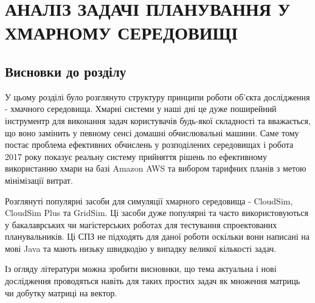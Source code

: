 
\chapter{АНАЛІЗ ЗАДАЧІ ПЛАНУВАННЯ У ХМАРНОМУ СЕРЕДОВИЩІ}







\section*{Висновки до розділу}

У цьому розділі було розглянуто структуру принципи роботи об'єкта дослідження - хмачного середовища. Хмарні системи у наші дні це дуже поширейний інструментр для виконання задач користувачів будь-якої складності та вважається, що воно замінить у певному сенсі домашні обчислювальні машини. Саме тому постає проблема ефективних обчислень у розподілених середовищах і робота \cite{PushingTheBoundsOfMatrixMatrix} 2017 року показує реальну систему прийняття рішень по ефективному використанню хмари на базі Amazon AWS та вибором тарифних планів з метою мінімізації витрат.

Розглянуті популярні засоби для симуляції хмарного середовища - CloudSim, CloudSim Plus та GridSim. Ці засоби дуже популярні та часто використовуються у бакалаврських чи магістерських роботах для тестування спроектованих планувальників. Ці СПЗ не підходять для даної роботи оскільки вони написані на мові Java та мають низьку швидкодію у випадку великої кількості задач.

Із огляду літератури можна зробити висновнки, що тема актуальна і нові дослідження проводяться навіть для таких простих задач як множення матриць чи добутку матриці на вектор.